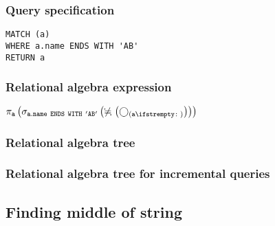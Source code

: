 \subsubsection*{Query specification}

\begin{lstlisting}
MATCH (a)
WHERE a.name ENDS WITH 'AB'
RETURN a
\end{lstlisting}

\subsubsection*{Relational algebra expression}

$\projection{\var{a}} \left(\selection{\mathtt{a.name~ENDS~WITH~'AB'}} \left(\alldifferent{} \left(\getvertices{a}{}\right)\right)\right)$

\subsubsection*{Relational algebra tree}


\subsubsection*{Relational algebra tree for incremental queries}


\subsection{Finding middle of string}

